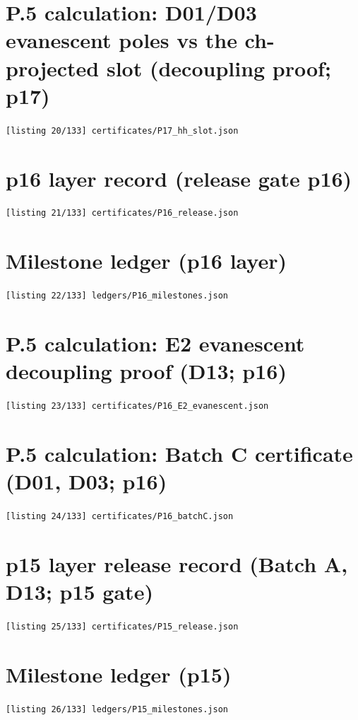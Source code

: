 \section{P.5 calculation: D01/D03 evanescent poles vs the ch-projected slot (decoupling proof; p17)}
\noindent\texttt{[listing 20/133] certificates/P17\_hh\_slot.json}
{\scriptsize}

\section{p16 layer record (release gate p16)}
\noindent\texttt{[listing 21/133] certificates/P16\_release.json}
{\scriptsize}

\section{Milestone ledger (p16 layer)}
\noindent\texttt{[listing 22/133] ledgers/P16\_milestones.json}
{\scriptsize}

\section{P.5 calculation: E2 evanescent decoupling proof (D13; p16)}
\noindent\texttt{[listing 23/133] certificates/P16\_E2\_evanescent.json}
{\scriptsize}

\section{P.5 calculation: Batch C certificate (D01, D03; p16)}
\noindent\texttt{[listing 24/133] certificates/P16\_batchC.json}
{\scriptsize}

\section{p15 layer release record (Batch A, D13; p15 gate)}
\noindent\texttt{[listing 25/133] certificates/P15\_release.json}
{\scriptsize}

\section{Milestone ledger (p15)}
\noindent\texttt{[listing 26/133] ledgers/P15\_milestones.json}
{\scriptsize}

